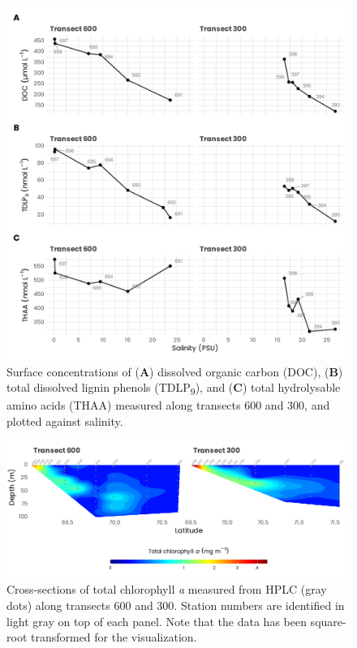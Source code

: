 \documentclass[essd, manuscript]{copernicus}
\begin{document}
\begin{figure}[H]
    \centering
    \includegraphics[scale = 1]{../../../graphs/fig09.pdf}
    \caption{Surface concentrations of (\textbf{A}) dissolved organic carbon (DOC), (\textbf{B}) total dissolved lignin phenols (TDLP\textsubscript{9}), and (\textbf{C}) total hydrolysable amino acids (THAA) measured along transects 600 and 300, and plotted against salinity.}
\end{figure}

\clearpage

\begin{figure}[H]
    \centering
    \includegraphics[scale = 1]{../../../graphs/fig10.pdf}
    \caption{Cross-sections of total chlorophyll \textit{a} measured from HPLC (gray dots) along transects 600 and 300. Station numbers are identified in light gray on top of each panel. Note that the data has been square-root transformed for the visualization.}
\end{figure}
\end{document}
